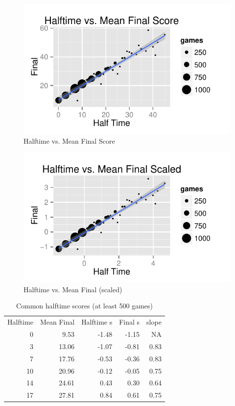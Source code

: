 \documentclass[landscape]{exam}
\begin{document}
  \begin{figure}[H]
    \centering
    \includegraphics{figures/nfl/ht_vs_mean_final.pdf}
    \caption{Halftime vs. Mean Final Score}
  \end{figure}

  \begin{figure}[H]
    \centering
    \includegraphics{figures/nfl/ht_vs_mean_final_scaled.pdf}
    \caption{Halftime vs. Mean Final (scaled)}
  \end{figure}

  \begin{table}[H]
    \centering
    \begin{tabular}{rrrrr}
      \toprule
      \midrule
      Halftime & Mean Final & Halftime s & Final s & slope\\
      0        & 9.53       & -1.48      & -1.15   & NA \\
      3        & 13.06      & -1.07      & -0.81   & 0.83 \\
      7        & 17.76      & -0.53      & -0.36   & 0.83 \\
      10       & 20.96      & -0.12      & -0.05   & 0.75 \\
      14       & 24.61      & 0.43       & 0.30    & 0.64 \\
      17       & 27.81      & 0.84       & 0.61    & 0.75 \\
      \bottomrule
    \end{tabular}
    \caption{Common halftime scores (at least 500 games)}
  \end{table}
\end{document}
